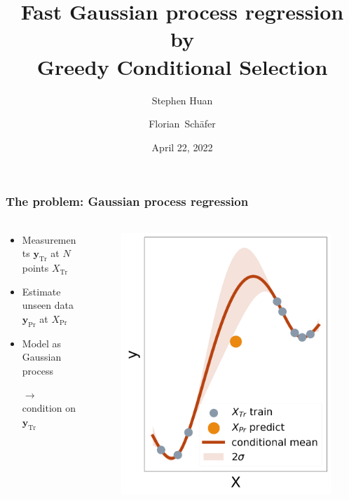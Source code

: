 \documentclass{beamer}                             %
\title[]{Fast Gaussian process regression by \\ Greedy Conditional Selection}
\subtitle{}
\author[Huan, Sch{\"a}fer]
{Stephen Huan \and Florian\ Sch{\"a}fer}
\institute[Georgia Institute of Technology]
{
  Short \& Sweet seminar
}
\date[]{April 22, 2022}
\renewcommand{\vec}[1]{\bm{#1}}
\renewcommand{\vec}[1]{\bm{#1}}
\begin{document}
\frame{\titlepage}

\begin{frame}
\frametitle{The problem: Gaussian process regression}
\framesubtitle{}
  \begin{columns}
    \begin{column}{0.6\textwidth}
      \begin{itemize}
        \item<+-> Measurements \( \vec{y}_\text{Tr} \) at
          \( N \) points \( X_\text{Tr} \)

        \item<+-> Estimate unseen data \(
          \vec{y}_\text{Pr} \) at \( X_\text{Pr} \)

        \item<+-> Model as Gaussian process

          \( \rightarrow \) condition on \( \vec{y}_\text{Tr} \)
      \end{itemize}
    \end{column}
    \begin{column}{0.4\textwidth}
      \begin{figure}
        \centering
        \includegraphics[width=\textwidth]{graphs/predict_all}
      \end{figure}
    \end{column}
  \end{columns}
\end{frame}
\end{document}
